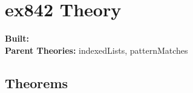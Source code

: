 \documentclass[11pt, twoside]{article}
\begin{document}


\tableofcontents
\cleardoublepage
\HOLpagestyle

\section{ex842 Theory}
\begin{flushleft}
\textbf{Built:} \HOLexEightFourTwoDate \\[2pt]
\textbf{Parent Theories:} indexedLists, patternMatches
\end{flushleft}



\subsection{Theorems}

\HOLexEightFourTwoTheorems

\HOLindex
\end{document}

